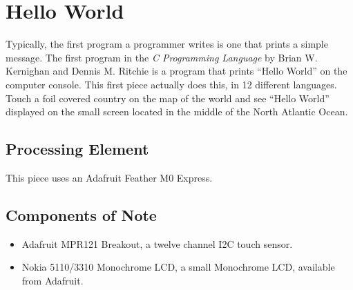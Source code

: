 %
%
%
%
% 
%
%
%
%
%
% 
%

\section{Hello World}

Typically, the first program a programmer writes is one that prints a simple 
message.  The first program in the \textit{C Programming Language} by  Brian 
W. Kernighan and Dennis M. Ritchie is a program that prints ``Hello World'' on 
the computer console.  This first piece actually does this, in 12 different 
languages.  Touch a foil covered country on the map of the world and see 
``Hello World'' displayed on the small screen located in the middle of the 
North Atlantic Ocean.

\subsection*{Processing Element}

This piece uses an Adafruit Feather M0 Express.

\subsection*{Components of Note}

\begin{itemize}
\item Adafruit MPR121 Breakout, a twelve channel I2C touch sensor.
\item Nokia 5110/3310 Monochrome LCD, a small Monochrome LCD, available from 
Adafruit.
\end{itemize}

